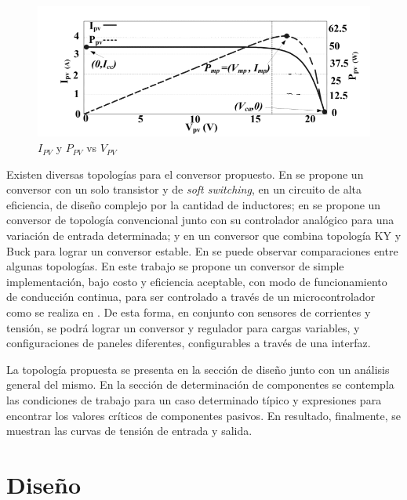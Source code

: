         \begin{figure}[htbp]
            \centering
            \includegraphics[scale = 0.25]{Figuras/Curva_MPPT.png}
            \caption{$I_{PV}$ y $P_{PV}$ vs $V_{PV}$ \cite{gallardo2014diseno}  }
            \label{fig: Curva MPPT}
        \end{figure}
    
    Existen diversas topologías para el conversor propuesto. En \cite{Kiran} se propone un conversor con un solo transistor y  de \textit{soft switching}, en \cite{9106477} un circuito de alta eficiencia, de diseño complejo por la cantidad de inductores; en \cite{5701795} se propone un conversor de topología convencional junto con su controlador analógico para una variación de entrada determinada; y en \cite{6119227} un conversor que combina topología KY y Buck para lograr un conversor estable. En \cite{954206} se puede observar comparaciones entre algunas topologías. En este trabajo se propone un conversor de simple implementación, bajo costo y eficiencia aceptable, con modo de funcionamiento de conducción continua, para ser controlado a través de un microcontrolador como se realiza en \cite{Chang}. De esta forma, en conjunto con sensores de corrientes y tensión, se podrá lograr un conversor y regulador para cargas variables, y configuraciones de paneles diferentes, configurables a través de una interfaz.
 
    La topología propuesta se presenta en la sección de diseño junto con un análisis general del mismo. En la sección de determinación de componentes se contempla las condiciones de trabajo para un caso determinado típico y expresiones para encontrar los valores críticos de componentes pasivos. En resultado, finalmente, se muestran las curvas de tensión de entrada y salida. 
 
\section{Diseño}
    
